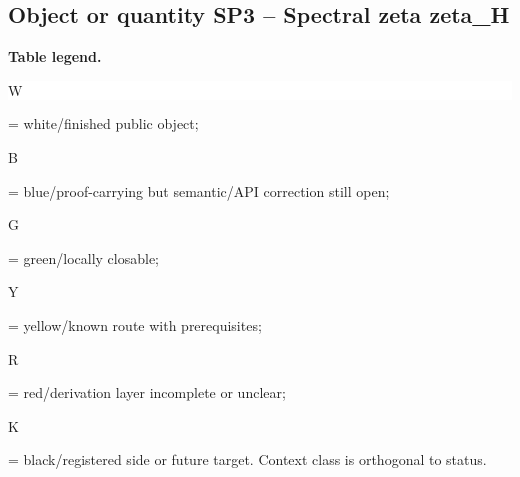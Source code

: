 \subsection*{Object or quantity SP3 -- Spectral zeta zeta\_H}
\hypertarget{objproof:SP3}{}
\par\smallskip\noindent\begin{minipage}{0.99\linewidth}\footnotesize\raggedright\textbf{Table legend.} \colorbox{white}{\strut W} = white/finished public object; \colorbox{cyan!20}{\strut B} = blue/proof-carrying but semantic/API correction still open; \colorbox{green!18}{\strut G} = green/locally closable; \colorbox{yellow!25}{\strut Y} = yellow/known route with prerequisites; \colorbox{red!20}{\strut R} = red/derivation layer incomplete or unclear; \colorbox{black!18}{\strut K} = black/registered side or future target. Context class is orthogonal to status.\end{minipage}\par\vspace{0.25em}
